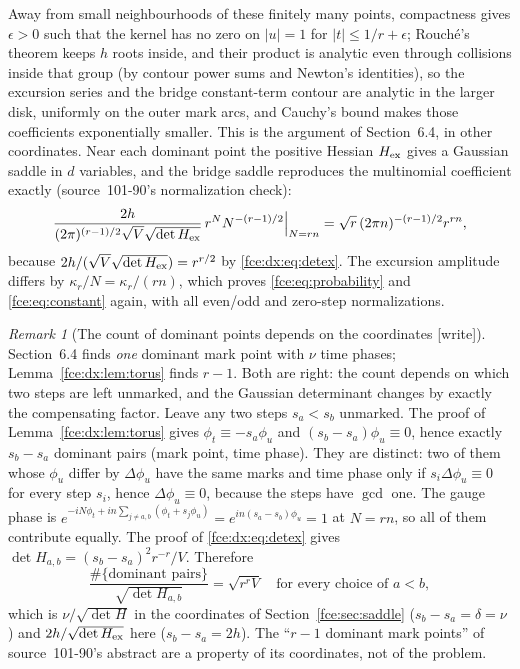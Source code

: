 \documentclass[11pt,a4paper]{article}
\numberwithin{equation}{section}
\theoremstyle{definition}\newtheorem{definition}[theorem]{Definition}
\theoremstyle{remark}\newtheorem{remark}[theorem]{Remark}
\begin{document}
Away from small neighbourhoods of these finitely many points, compactness
gives $\epsilon>0$ such that the kernel has no zero on $|u|=1$ for
$|t|\le1/r+\epsilon$; Rouch\'e's theorem keeps $h$ roots inside, and their
product is analytic even through collisions inside that group (by contour
power sums and Newton's identities), so the excursion series and the bridge
constant-term contour are analytic in the larger disk, uniformly on the outer
mark arcs, and Cauchy's bound makes those coefficients exponentially smaller.
This is the argument of Section~6.4, in other coordinates. Near each dominant
point the positive Hessian $H_{\rm ex}$ gives a Gaussian saddle in $d$
variables, and the bridge saddle reproduces the multinomial coefficient
exactly (source~101-90's normalization check):
\begin{equation}\label{fce:dx:eq:normcheck}
 \frac{2h}{(2\pi)^{(r-1)/2}\sqrt V\sqrt{\det H_{\rm ex}}}\,r^NN^{-(r-1)/2}\Big|_{N=rn}
 =\sqrt r\,(2\pi n)^{-(r-1)/2}r^{rn},
\end{equation}
because $2h/(\sqrt V\sqrt{\det H_{\rm ex}})=r^{r/2}$ by \eqref{fce:dx:eq:detex}.
The excursion amplitude differs by $\kappa_r/N=\kappa_r/(rn)$, which proves
\eqref{fce:eq:probability} and \eqref{fce:eq:constant} again, with all
even/odd and zero-step normalizations.

\begin{remark}[The count of dominant points depends on the coordinates \textup{[write]}]\label{fce:dx:rem:invariant}
Section~6.4 finds \emph{one} dominant mark point with $\nu$ time phases;
Lemma~\ref{fce:dx:lem:torus} finds $r-1$. Both are right: the count depends on
which two steps are left unmarked, and the Gaussian determinant changes by
exactly the compensating factor. Leave any two steps $s_a<s_b$ unmarked. The
proof of Lemma~\ref{fce:dx:lem:torus} gives $\phi_t\equiv-s_a\phi_u$ and
$(s_b-s_a)\phi_u\equiv0$, hence exactly $s_b-s_a$ dominant pairs (mark point,
time phase). They are distinct: two of them whose $\phi_u$ differ by
$\Delta\phi_u$ have the same marks and time phase only if
$s_i\Delta\phi_u\equiv0$ for every step $s_i$, hence $\Delta\phi_u\equiv0$,
because the steps have $\gcd$ one. The gauge phase is
$e^{-iN\phi_t+in\sum_{j\ne a,b}(\phi_t+s_j\phi_u)}
=e^{in(s_a-s_b)\phi_u}=1$ at $N=rn$, so all of them contribute equally. The
proof of \eqref{fce:dx:eq:detex} gives
$\det H_{a,b}=(s_b-s_a)^2r^{-r}/V$. Therefore
\begin{equation}\label{fce:dx:eq:invariant}
 \frac{\#\{\text{dominant pairs}\}}{\sqrt{\det H_{a,b}}}
 =\sqrt{r^rV}\quad\text{for every choice of }a<b ,
\end{equation}
which is $\nu/\sqrt{\det H}$ in the coordinates of Section~\ref{fce:sec:saddle}
($s_b-s_a=\delta=\nu$) and $2h/\sqrt{\det H_{\rm ex}}$ here ($s_b-s_a=2h$).
The ``$r-1$ dominant mark points'' of source~101-90's abstract are a property
of its coordinates, not of the problem.
\end{remark}
\end{document}
